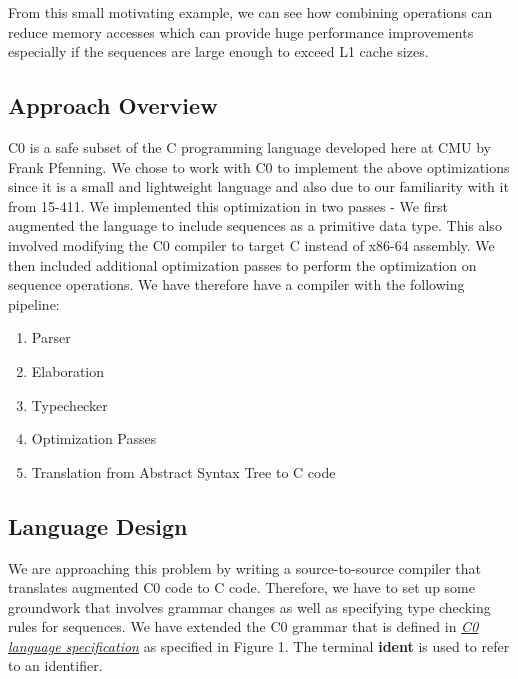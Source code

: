 \documentclass[a4paper,twocolumn]{article}
\begin{document}
From this small motivating example, we can see how combining operations can
reduce memory accesses which can provide huge performance improvements
especially if the sequences are large enough to exceed L1 cache sizes.

\subsection{Approach Overview}
C0 is a safe subset of the C programming language developed here at CMU by
Frank Pfenning. We chose to work with C0 to implement the above optimizations
since it is a small and lightweight language and also due to our familiarity with it
from 15-411. We implemented this optimization in two passes - We first
augmented the language to include sequences as a primitive data type. This also
involved modifying the C0 compiler to target C instead of x86-64 assembly. We
then included additional optimization passes to perform the optimization on
sequence operations. We have therefore have a compiler with the following pipeline:
\begin{enumerate}
  \item Parser
  \item Elaboration
  \item Typechecker
  \item Optimization Passes
  \item Translation from Abstract Syntax Tree to C code
\end{enumerate}
\setlength{\grammarparsep}{5pt plus 1pt minus 1pt} %
\setlength{\grammarindent}{10em} %

\subsection{Language Design}

\newcommand{\nonterm}[1]{$\langle${#1}$\rangle$}
\newcommand{\OR}{\ensuremath{\ | \ \ }}
\newcommand{\term}[1]{\textbf{#1}}
\newcommand{\code}[1]{\texttt{#1}}

We are approaching this problem by writing a source-to-source compiler that
translates augmented C0 code to C code. Therefore, we have to set up some
groundwork that involves grammar changes as well as specifying type checking
rules for sequences. We have extended the C0 grammar that is defined in
\href{http://c0.typesafety.net/doc/c0-reference.pdf}{\textit{C0 language
    specification}} as specified in Figure 1.
The terminal \term{ident} is used to refer to an identifier.
\end{document}

